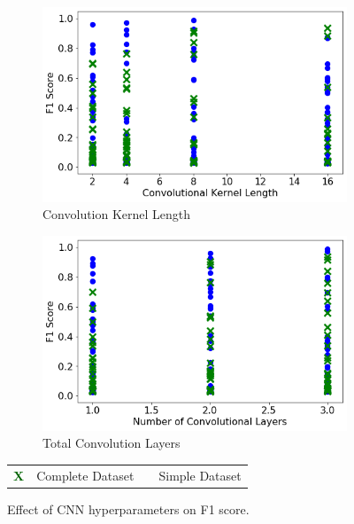 \begin{figure}[H]
     \begin{subfigure}[b]{0.49\textwidth}
         \centering
         \includegraphics[width=\textwidth]{images/cnn_kernel_length.png}
         \caption{Convolution Kernel Length}
         \label{fig:cnn_kernel_length}
     \end{subfigure}
     \hfill
     \begin{subfigure}[b]{0.49\textwidth}
         \centering
         \includegraphics[width=\textwidth]{images/cnn_num_conv_layers.png}
         \caption{Total Convolution Layers}
         \label{fig:cnn_num_conv_layers}
     \end{subfigure}  
	\begin{tabular}{r@{ : }l r@{ : }l}
		\textcolor{darkgreen}{\textbf{\large{X}}} & Complete Dataset & \bluecircle & Simple Dataset \\
	\end{tabular}
    \caption{Effect of CNN hyperparameters on F1 score.}
\end{figure}

